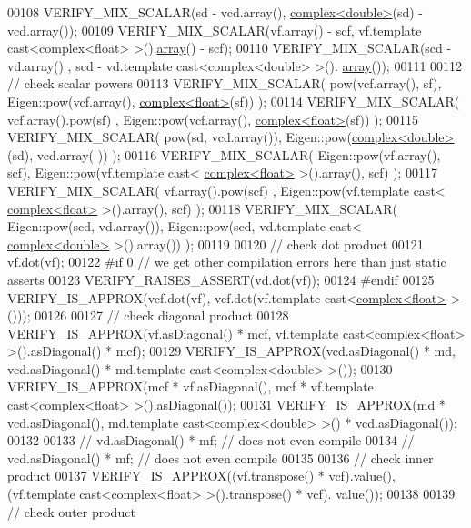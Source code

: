 \begin{DoxyCode}
00108   VERIFY\_MIX\_SCALAR(sd  - vcd.array(), \hyperlink{structcomplex}{complex<double>}(sd) - vcd.array());
00109   VERIFY\_MIX\_SCALAR(vf.array()  - scf, vf.template cast<complex<float> >().\hyperlink{class_eigen_1_1array}{array}() - scf);
00110   VERIFY\_MIX\_SCALAR(scd - vd.array() , scd - vd.template cast<complex<double> >().
      \hyperlink{class_eigen_1_1array}{array}());
00111 
00112   \textcolor{comment}{// check scalar powers}
00113   VERIFY\_MIX\_SCALAR( pow(vcf.array(), sf),        Eigen::pow(vcf.array(), 
      \hyperlink{structcomplex}{complex<float>}(sf)) );
00114   VERIFY\_MIX\_SCALAR( vcf.array().pow(sf) ,        Eigen::pow(vcf.array(), 
      \hyperlink{structcomplex}{complex<float>}(sf)) );
00115   VERIFY\_MIX\_SCALAR( pow(sd, vcd.array()),        Eigen::pow(\hyperlink{structcomplex}{complex<double>}(sd), vcd.array(
      )) );
00116   VERIFY\_MIX\_SCALAR( Eigen::pow(vf.array(), scf), Eigen::pow(vf.template cast<
      \hyperlink{structcomplex}{complex<float>} >().array(), scf) );
00117   VERIFY\_MIX\_SCALAR( vf.array().pow(scf) ,        Eigen::pow(vf.template cast<
      \hyperlink{structcomplex}{complex<float>} >().array(), scf) );
00118   VERIFY\_MIX\_SCALAR( Eigen::pow(scd, vd.array()), Eigen::pow(scd, vd.template cast<
      \hyperlink{structcomplex}{complex<double>} >().array()) );
00119 
00120   \textcolor{comment}{// check dot product}
00121   vf.dot(vf);
00122 \textcolor{preprocessor}{#if 0 // we get other compilation errors here than just static asserts}
00123   VERIFY\_RAISES\_ASSERT(vd.dot(vf));
00124 \textcolor{preprocessor}{#endif}
00125   VERIFY\_IS\_APPROX(vcf.dot(vf), vcf.dot(vf.template cast<\hyperlink{structcomplex}{complex<float>} >()));
00126 
00127   \textcolor{comment}{// check diagonal product}
00128   VERIFY\_IS\_APPROX(vf.asDiagonal() * mcf, vf.template cast<complex<float> >().asDiagonal() * mcf);
00129   VERIFY\_IS\_APPROX(vcd.asDiagonal() * md, vcd.asDiagonal() * md.template cast<complex<double> >());
00130   VERIFY\_IS\_APPROX(mcf * vf.asDiagonal(), mcf * vf.template cast<complex<float> >().asDiagonal());
00131   VERIFY\_IS\_APPROX(md * vcd.asDiagonal(), md.template cast<complex<double> >() * vcd.asDiagonal());
00132 
00133 \textcolor{comment}{//   vd.asDiagonal() * mf;    // does not even compile}
00134 \textcolor{comment}{//   vcd.asDiagonal() * mf;   // does not even compile}
00135 
00136   \textcolor{comment}{// check inner product}
00137   VERIFY\_IS\_APPROX((vf.transpose() * vcf).value(), (vf.template cast<complex<float> >().transpose() * vcf).
      value());
00138 
00139   \textcolor{comment}{// check outer product}

\end{DoxyCode}
